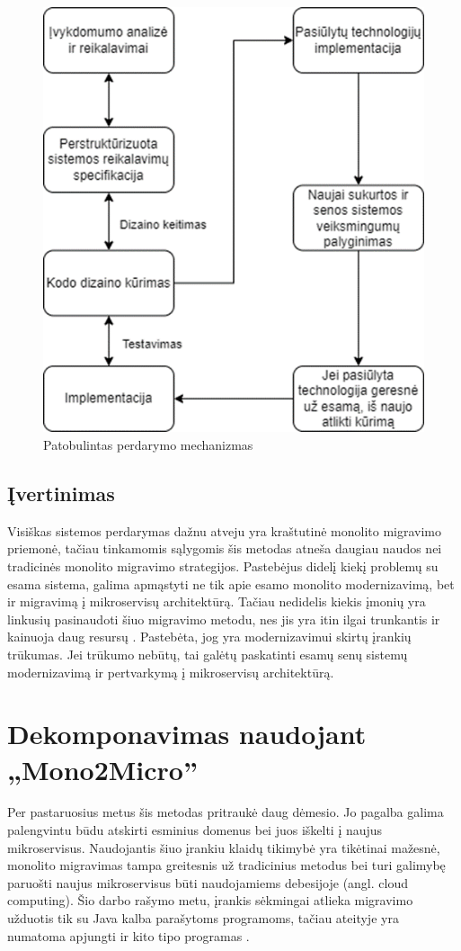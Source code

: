 \documentclass{VUMIFPSbakalaurinis}
\begin{document}
\begin{figure}[H]
    \centering
    \includegraphics{img/patobulintas-perdarymas.png}
    \caption{Patobulintas perdarymo mechanizmas \cite{MQO18}}
    \label{img:patobulintas-perdarymas}
\end{figure}

\subsection{Įvertinimas}
Visiškas sistemos perdarymas dažnu atveju yra kraštutinė monolito migravimo priemonė, tačiau tinkamomis sąlygomis šis metodas atneša daugiau naudos nei tradicinės monolito migravimo strategijos. Pastebėjus didelį kiekį problemų su esama sistema, galima apmąstyti ne tik apie esamo monolito modernizavimą, bet ir migravimą į mikroservisų architektūrą. Tačiau nedidelis kiekis įmonių yra linkusių pasinaudoti šiuo migravimo metodu, nes jis yra itin ilgai trunkantis ir kainuoja daug resursų \cite{MQO18}. Pastebėta, jog yra modernizavimui skirtų įrankių trūkumas. Jei trūkumo nebūtų, tai galėtų paskatinti esamų senų sistemų modernizavimą ir pertvarkymą į mikroservisų architektūrą.

\section{Dekomponavimas naudojant „Mono2Micro”}
Per pastaruosius metus šis metodas pritraukė daug dėmesio. Jo pagalba galima palengvintu būdu atskirti esminius domenus bei juos iškelti į naujus mikroservisus. Naudojantis šiuo įrankiu klaidų tikimybė yra tikėtinai mažesnė, monolito migravimas tampa greitesnis už tradicinius metodus bei turi galimybę paruošti naujus mikroservisus būti naudojamiems debesijoje (angl. cloud computing). Šio darbo rašymo metu, įrankis sėkmingai atlieka migravimo užduotis tik su Java kalba parašytoms programoms, tačiau ateityje yra numatoma apjungti ir kito tipo programas \cite{KXL+20}.
\end{document}
